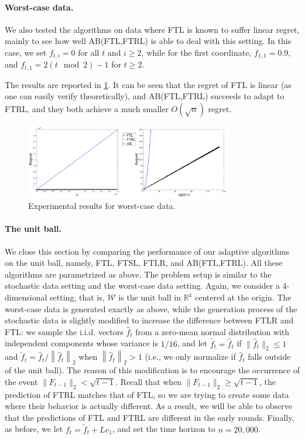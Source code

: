 \documentclass[english]{article}
\newcommand{\cW}{\mathcal{W}}
\newcommand{\R}{\mathbb{R}}
\newcommand{\norm}[1]{\left\| #1 \right\|}
\begin{document}
\paragraph{Worst-case data.}
We also tested the algorithms on data where FTL is known to suffer linear regret, mainly to see how well AB(FTL,FTRL) is able to deal with this setting.
In this case, we set $f_{t,i}=0$ for all $t$ and $i\ge 2$, while 
for the first coordinate, $f_{1,1} = 0.9$, and $f_{t,1} = 2(t \mod 2) - 1$ for $t \ge 2$.

The results are reported in \cref{res:worst_case}. It can be seen that the regret of FTL is linear (as one can easily verify theoretically), and 
AB(FTL,FTRL) succeeds to adapt to FTRL, and they both achieve a much smaller $O(\sqrt{n})$ regret. 

\begin{figure}[th]
	\centering
	\includegraphics[width=0.8\textwidth]{figures/ExpResults/WorstCase_alt_new}	
	\caption{Experimental results for worst-case data. \label{res:worst_case}}
\end{figure}


\paragraph{The unit ball.}
We close this section by comparing the performance of our adaptive algorithms on the unit ball, namely, FTL, FTSL, FTLR, and AB(FTL,FTRL). All these algorithms are parametrized as above. The problem setup is similar to the stochastic data setting and the worst-case data setting. Again, we consider a 4-dimensional setting, that is, $\cW$ is the unit ball in $\R^4$ centered at the origin.
The worst-case data is generated exactly as above, while the generation process of the stochastic data is slightly modified to increase the difference between FTLR and FTL: we sample the i.i.d. vectors $\hat{f}_t$ from a zero-mean normal distribution with independent components whose variance is $1/16$, and let $\tilde{f_t}=\hat{f}_t$ if $\|\hat{f}_t\|_2 \le 1$ and $\tilde{f}_t = \hat{f}_t/\norm{\hat{f}_t}_2$ when $\norm{\hat{f}_t}_2>1$ (i.e., we only normalize if $\hat{f}_t$ falls outside of the unit ball).
The reason of this modification is to encourage the occurrence of the event $\|F_{t-1}\|_2 < \sqrt{t-1}$. Recall that when $\|F_{t-1}\|_2 \ge \sqrt{t-1}$, the prediction of FTRL matches that of FTL, so we are trying to create some data where their behavior is actually different. As a result, we will be able to observe that the predictions of FTL and FTRL are different in the early rounds. Finally, as before, we let $f_t=\tilde{f}_t + L e_1$, and set the time horizon to $n=20,000$.
 
\end{document}

